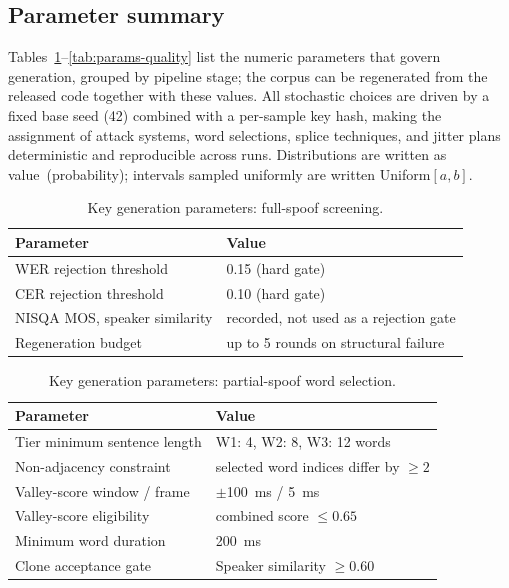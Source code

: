 \documentclass[11pt]{article}
\begin{document}
\FloatBarrier
\subsection*{Parameter summary}

Tables~\ref{tab:params-fullspoof}--\ref{tab:params-quality} list the
numeric parameters that govern generation, grouped by pipeline stage;
the corpus can be regenerated from the released code together with
these values. All stochastic choices are driven by a fixed base seed
(42) combined with a per-sample key hash, making the assignment of
attack systems, word selections, splice techniques, and jitter plans
deterministic and reproducible across runs. Distributions are written
as value~(probability); intervals sampled uniformly are written
Uniform$[a,b]$.

\begin{table}[H]
\centering
\caption{Key generation parameters: full-spoof screening.}
\label{tab:params-fullspoof}
\small
\begin{tabular}{p{4.9cm}p{7.2cm}}
\toprule
\textbf{Parameter} & \textbf{Value} \\
\midrule
WER rejection threshold & 0.15 (hard gate) \\
CER rejection threshold & 0.10 (hard gate) \\
NISQA MOS, speaker similarity & recorded, not used as a rejection gate \\
Regeneration budget & up to 5 rounds on structural failure \\
\bottomrule
\end{tabular}
\end{table}

\begin{table}[H]
\centering
\caption{Key generation parameters: partial-spoof word selection.}
\label{tab:params-wordselect}
\small
\begin{tabular}{p{4.9cm}p{7.2cm}}
\toprule
\textbf{Parameter} & \textbf{Value} \\
\midrule
Tier minimum sentence length & W1: 4, W2: 8, W3: 12 words \\
Non-adjacency constraint & selected word indices differ by $\geq 2$ \\
Valley-score window / frame & $\pm$\SI{100}{\milli\second} / \SI{5}{\milli\second} \\
Valley-score eligibility & combined score $\leq 0.65$ \\
Minimum word duration & \SI{200}{\milli\second} \\
Clone acceptance gate & Speaker similarity $\geq 0.60$ \\
\bottomrule
\end{tabular}
\end{table}
\end{document}
